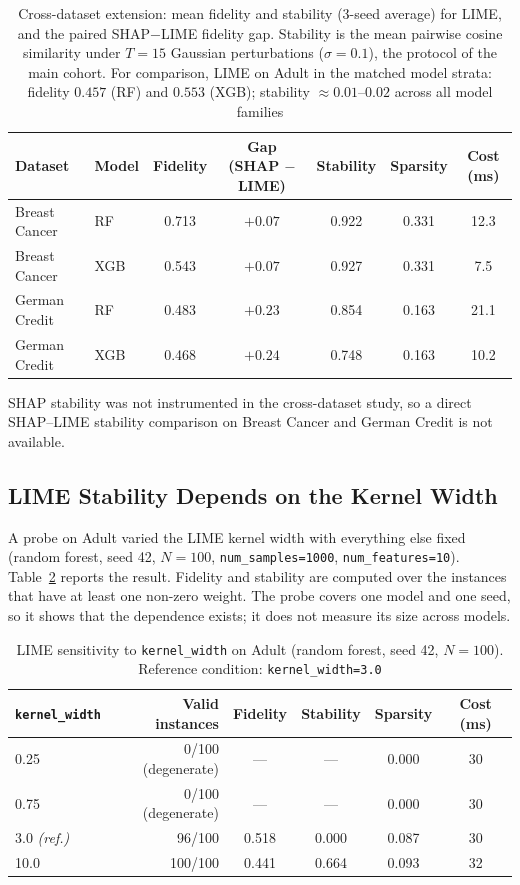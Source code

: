 \documentclass{cleiej}
\begin{document}
\begin{table}[!htb]
\centering
\caption{Cross-dataset extension: mean fidelity and stability (3-seed
average) for LIME, and the paired SHAP$-$LIME fidelity gap. Stability is
the mean pairwise cosine similarity under $T=15$ Gaussian perturbations
($\sigma=0.1$), the protocol of the main cohort. For comparison, LIME on
Adult in the matched model strata: fidelity $0.457$ (RF) and $0.553$ (XGB);
stability $\approx 0.01$--$0.02$ across all model families}
\label{tab:exp3_lime}
\begin{tabular}{llccccc}
\toprule
Dataset        & Model & Fidelity & Gap (SHAP $-$ LIME) & Stability & Sparsity & Cost (ms) \\
\midrule
Breast Cancer  & RF    & 0.713    & $+0.07$ & 0.922     & 0.331    & 12.3 \\
Breast Cancer  & XGB   & 0.543    & $+0.07$ & 0.927     & 0.331    & 7.5  \\
German Credit  & RF    & 0.483    & $+0.23$ & 0.854     & 0.163    & 21.1 \\
German Credit  & XGB   & 0.468    & $+0.24$ & 0.748     & 0.163    & 10.2 \\
\bottomrule
\end{tabular}
\end{table}

SHAP stability was not instrumented in the cross-dataset study, so a direct
SHAP--LIME stability comparison on Breast Cancer and German Credit is not
available.

\subsection{LIME Stability Depends on the Kernel Width}
\label{sec:kernel}

A probe on Adult varied the LIME kernel width with everything else fixed
(random forest, seed 42, $N=100$, \texttt{num\_samples=1000},
\texttt{num\_features=10}). Table~\ref{tab:kw} reports the result. Fidelity
and stability are computed over the instances that have at least one
non-zero weight. The probe covers one model and one seed, so it shows that
the dependence exists; it does not measure its size across models.

\begin{table}[htb]
\centering
\caption{LIME sensitivity to \texttt{kernel\_width} on Adult (random
forest, seed 42, $N=100$). Reference condition: \texttt{kernel\_width=3.0}}
\label{tab:kw}
\begin{tabular}{lrcccc}
\toprule
\texttt{kernel\_width} & Valid instances & Fidelity & Stability & Sparsity & Cost (ms) \\
\midrule
0.25  & 0/100 (degenerate) & ---   & ---   & 0.000 & 30 \\
0.75  & 0/100 (degenerate) & ---   & ---   & 0.000 & 30 \\
3.0 \emph{(ref.)} & 96/100 & 0.518 & 0.000 & 0.087 & 30 \\
10.0  & 100/100            & 0.441 & 0.664 & 0.093 & 32 \\
\bottomrule
\end{tabular}
\end{table}
\end{document}

